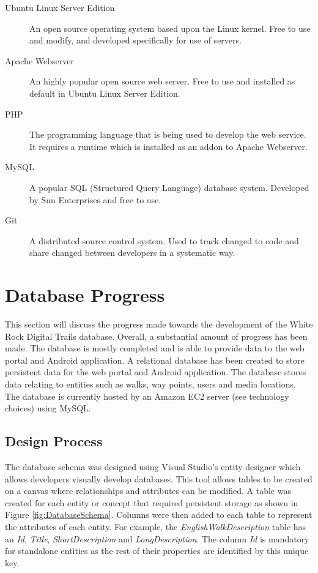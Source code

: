 \documentclass[11pt,a4paper]{article}
\begin{document}
\begin{description}
\item[Ubuntu Linux Server Edition] An open source operating system based upon the Linux kernel. Free to use and modify, and developed specifically for use of servers.

\item[Apache Webserver] An highly popular open source web server. Free to use and installed as default in Ubuntu Linux Server Edition.

\item[PHP] The programming language that is being used to develop the web service. It requires a runtime which is installed as an addon to Apache Webserver.

\item[MySQL] A popular SQL (Structured Query Language) database system. Developed by Sun Enterprises and free to use.

\item[Git] A distributed source control system. Used to track changed to code and share changed between developers in a systematic way.
\end{description}


\section{Database Progress}
\label{sec:dbProgress}
This section will discuss the progress made towards the development of the White Rock Digital Trails database.
Overall, a substantial amount of progress has been made.
The database is mostly completed and is able to provide data to the web portal and Android application.
A relational database has been created to store persistent data for the web portal and Android application.
The database stores data relating to entities such as walks, way points, users and media locations.
The database is currently hosted by an Amazon EC2 server (see technology choices) using MySQL.

\subsection{Design Process}

The database schema was designed using Visual Studio's entity designer which allows developers visually develop databases.
This tool allows tables to be created on a canvas where relationships and attributes can be modified.
A table was created for each entity or concept that required persistent storage as shown in Figure \ref{fig:DatabaseSchema}.
Columns were then added to each table to represent the attributes of each entity.
For example, the \emph{EnglishWalkDescription} table has an \emph{Id}, \emph{Title}, \emph{ShortDescription} and \emph{LongDescription}. The column \emph{Id} is mandatory for standalone entities as the rest of their properties are identified by this unique key.
\end{document}
